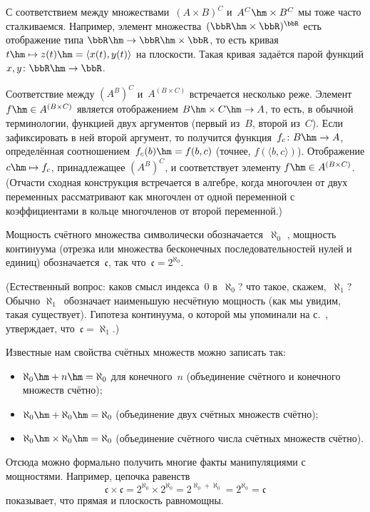 С соответствием между множествами~$(A\times B)^C$ и~$A^C\hm\times B^C$ мы тоже
часто сталкиваемся. Например, элемент
множества~$(\bbR\hm\times\bbR)^{\bbR}$ есть отображение типа
$\bbR\hm\to\bbR\hm\times\bbR$, то есть кривая
$t\hm\mapsto z(t)\hm= \langle x(t),y(t)\rangle$ на плоскости. Такая
кривая задаётся парой функций $x,y\colon \bbR\hm\to\bbR$.

Соответствие между $(A^B)^C$ и~$A^{(B\times C)}$ встречается
несколько реже. Элемент $f\hm\in A^{(B\times C)}$ является
отображением $B\hm\times C\hm\to A$, то есть, в обычной терминологии,
функцией двух аргументов (первый из~$B$, второй из~$C$). Если
зафиксировать в ней второй аргумент, то получится
функция~$f_c\colon B\hm\to A$, определённая
соотношением~$f_c(b)\hm=f(b,c)$ (точнее,
$f(\langle b,c\rangle)$). Отображение $c\hm\mapsto f_c$,
принадлежащее $(A^B)^C$, и соответствует
элементу $f\hm\in A^{(B\times C)}$.
(Отчасти сходная конструкция встречается в
алгебре, когда многочлен от двух переменных рассматривают как
многочлен от одной переменной с коэффициентами в кольце многочленов
от второй переменной.)

Мощность счётного множества символически обозначается~$\aleph_0$%
,
мощность континуума (отрезка или множества бесконечных последовательностей
нулей и единиц) обозначается~$\mathfrak{c}$,
так что~$\mathfrak{c}=2^{\aleph_0}$.

(Естественный вопрос: каков смысл индекса~$0$ в~$\aleph_0$?
что такое, скажем,~$\aleph_1$? Обычно $\aleph_1$~обозначает
наименьшую несчётную мощность (как мы увидим, такая существует).
Гипотеза континуума, о которой мы упоминали на
с.~\pageref{continuum-hypothesis}, утверждает,
что~$\mathfrak{c}=\aleph_1$.)

Известные нам свойства счётных множеств можно записать так:
   \begin{itemize}
\item
$\aleph_0 \hm+ n \hm= \aleph_0$ для конечного~$n$ (объединение счётного
             и конечного множеств счётно);
\item
$\aleph_0 \hm+ \aleph_0 \hm= \aleph_0$ (объединение двух счётных множеств
                                 счётно);
\item
$\aleph_0 \hm\times \aleph_0 \hm= \aleph_0$ (объединение счётного числа
                счётных множеств счётно).
   \end{itemize}

Отсюда можно формально получить многие факты манипуляциями
с мощностями. Например, цепочка равенств
        $$
\mathfrak{c}\times \mathfrak{c} = 2^{\aleph_0}\times 2^{\aleph_0} =
                                  2^{\aleph_0+\aleph_0} =
                                  2^{\aleph_0} = \mathfrak{c}
        $$
показывает, что прямая и плоскость равномощны.

